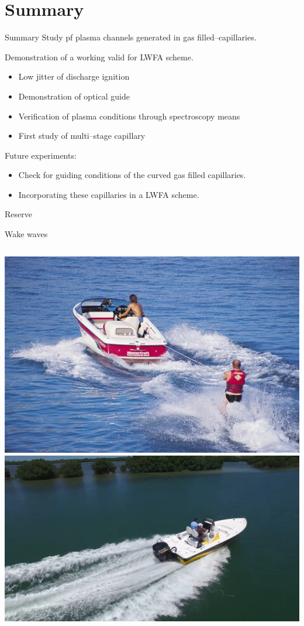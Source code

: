 \documentclass[dvipsnames]{beamer}
\begin{document}
\section{Summary}
\begin{frame}{Summary}
Study pf plasma channels generated in gas filled--capillaries.

Demonstration of a working valid for LWFA scheme.
\begin{itemize}
\item Low jitter of discharge ignition
\item Demonstration of optical guide
\item Verification of plasma conditions through spectroscopy means
\item First study of multi--stage capillary
\end{itemize}
Future experiments:
\begin{itemize}
\item Check for guiding conditions of the curved gas filled capillaries.
\item Incorporating these capillaries in a LWFA scheme.
\end{itemize}

\end{frame}
\begin{frame}{Reserve}
    
\end{frame}
\begin{frame}{Wake waves}
\begin{columns}  
\includegraphics[width=\textwidth]{figures/theory/boat_ski.jpg}
\includegraphics[width=\textwidth]{figures/theory/boat_wake.jpg}
\end{columns}
\end{frame}
\end{document}
